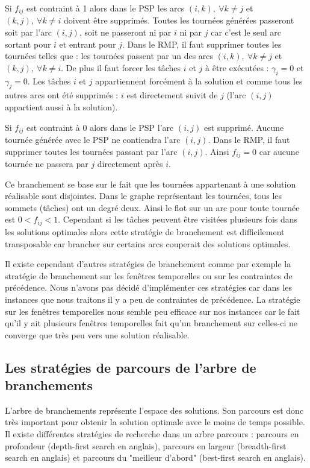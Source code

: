 Si $f_{ij}$ est contraint à 1 alors dans le PSP les arcs $(i,k),~\forall k\not=j$ et  $(k,j),~\forall k\not=i$ doivent être supprimés.
Toutes les tournées générées passeront soit par l'arc $(i,j)$, soit ne passeront ni par $i$ ni par $j$ car c'est le seul arc sortant pour $i$ et entrant pour $j$.
Dans le RMP, il faut supprimer toutes les tournées telles que : les tournées passent par un des arcs $(i,k),~\forall k\not=j$ et  $(k,j),~\forall k\not=i$.
De plus il faut forcer les tâches $i$ et $j$ à être exécutées : $\gamma_i=0$ et $\gamma_j=0$.
Les tâches $i$ et $j$ appartiennent forcément à la solution et comme tous les autres arcs ont été supprimés : $i$ est directement suivit de $j$ (l'arc $(i,j)$ appartient aussi à la solution).

Si $f_{ij}$ est contraint à 0 alors dans le PSP l'arc $(i,j)$ est supprimé. 
Aucune tournée générée avec le PSP ne contiendra l'arc $(i,j)$.
Dans le RMP, il faut supprimer toutes les tournées passant par l'arc $(i,j)$.
Ainsi $f_{ij}=0$ car aucune tournée ne passera par $j$ directement après $i$.

Ce branchement se base sur le fait que les tournées appartenant à une solution réalisable sont disjointes.
Dans le graphe représentant les tournées, tous les sommets (tâches) ont un degré deux.
Ainsi le flot sur un arc pour toute tournée est $0< f_{ij}<1$.
Cependant si les tâches peuvent être visitées plusieurs fois dans les solutions optimales alors cette stratégie de branchement est difficilement transposable car brancher sur certains arcs couperait des solutions optimales.


Il existe cependant d'autres stratégies de branchement comme par exemple la stratégie de branchement sur les fenêtres temporelles ou sur les contraintes de précédence.
Nous n'avons pas décidé d'implémenter ces stratégies car dans les instances que nous traitons il y a peu de contraintes de précédence. 
La stratégie sur les fenêtres temporelles nous semble peu efficace sur nos instances car le fait qu'il y ait plusieurs fenêtres temporelles fait qu'un branchement sur celles-ci ne converge que très peu vers une solution réalisable.


\subsection{Les stratégies de parcours de l'arbre de branchements}

L'arbre de branchements représente l'espace des solutions.
Son parcours est donc très important pour obtenir la solution optimale avec le moins de temps possible.
Il existe différentes stratégies de recherche dans un arbre parcours : parcours en profondeur (depth-first search en anglais), parcours en largeur (breadth-first search en anglais) et parcours du "meilleur d'abord" (best-first search en anglais).

